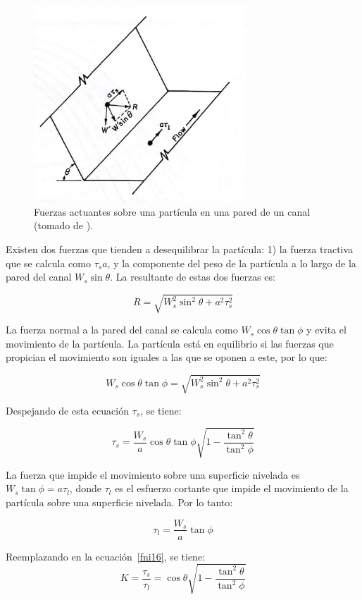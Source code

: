\documentclass[11pt, oneside]{article}
\begin{document}
\begin{figure}[h!]
\centering
\includegraphics[width=8cm]{fig92.jpeg}
\caption{Fuerzas actuantes sobre una part\'icula en una pared de un canal (tomado de \cite{Chau}).}
\label{fnor7}
\end{figure}

Existen dos fuerzas que tienden a desequilibrar la part\'icula: 1) la fuerza tractiva que se calcula como $\tau_s a$, y la componente del peso de la part\'icula a lo largo de la pared del canal $W_s \sin \theta$. La resultante de estas dos fuerzas es:

$$
R=\sqrt{W_s^2 \sin^2 \theta + a^2 \tau_s^2}   
$$

La fuerza normal a la pared del canal se calcula como $W_s \cos \theta \tan \phi$ y evita el movimiento de la part\'icula. La part\'icula est\'a en equilibrio si las fuerzas que propician el movimiento son iguales a las que se oponen a este, por lo que:

$$
W_s \cos \theta \tan \phi =\sqrt{W_s^2 \sin^2 \theta + a^2 \tau_s^2}   
$$

Despejando de esta ecuaci\'on $\tau_s$, se tiene:

\begin{equation}
\tau_s = \frac{W_s}{a}\cos \theta \tan \phi \sqrt{1-\frac{\tan^2 \theta}{\tan^2 \phi}}
\label{fni16}
\end{equation}

La fuerza que impide el movimiento sobre una superficie nivelada es $W_s \tan \phi = a \tau_l$, donde $\tau_l$ es el esfuerzo cortante que impide el movimiento de la part\'icula sobre una superficie nivelada. Por lo tanto:

$$
\tau_l = \frac{W_s}{a} \tan \phi
$$

Reemplazando en la ecuaci\'on~\ref{fni16}, se tiene:
\begin{equation}
K = \frac{\tau_s}{\tau_l} = \cos \theta \sqrt{1-\frac{\tan^2 \theta}{\tan^2 \phi}}
\label{fni17}
\end{equation}
\end{document}
